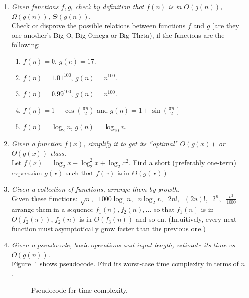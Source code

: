 \documentclass[a4paper,12pt]{article}
\begin{document}
\begin{enumerate}
\item {\small \em Given functions $f,g$, check by definition that $f(n)$ is in $O(g(n))$, $\Omega(g(n))$, $\Theta(g(n))$.}\\
Check or disprove the possible relations between functions $f$ and $g$ (are they one another's Big-O, Big-Omega or Big-Theta), if the
functions are the following:
\begin{enumerate}
\item $f(n) = 0$, $g(n) = 17$.
\item $f(n) = 1.01^{100}$, $g(n) = n^{100}$.
\item $f(n) = 0.99^{100}$, $g(n) = n^{100}$.
\item $f(n) = 1 + \cos\left( \frac{\pi n}{2}\right)$ and  $g(n) = 1 + \sin\left( \frac{\pi n}{2}\right)$
\item $f(n) = \log_2 n$, $g(n) = \log_{10} n$.
\end{enumerate}

\item {\small \em Given a function $f(x)$, simplify it to get its ``optimal'' $O(g(x))$ or $\Theta(g(x))$ class.}\\
Let $f(x) = \log_2 x + \log_2^2 x + \log_2 x^2$. Find a short (preferably one-term) expression $g(x)$ such
that $f(x)$ is in $\Theta(g(x))$.

\item {\small \em Given a collection of functions, arrange them by growth.}\\
Given these functions: $\sqrt{n},\;\;1000 \log_2 n,\;\;n \log_2 n,\;\;2n!,\;\;(2n)!,\;\;2^n,\;\;\frac{n^2}{1000}$
arrange them in a sequence $f_1(n), f_2(n), \ldots$ so that $f_1(n)$ is in $O(f_2(n))$,
$f_2(n)$ is in $O(f_3(n))$ and so on. (Intuitively, every next function must asymptotically grow faster than the previous one.)


\item {\small \em Given a pseudocode, basic operations and input length, estimate its time as $O(g(n))$.}\\
Figure~\ref{fig:part3-big-o-pseudocode} shows pseudocode. Find its worst-case time complexity in terms of $n$.
\begin{figure}[!htb]
\caption{\label{fig:part3-big-o-pseudocode}} Pseudocode for time complexity.
\end{figure}

\end{enumerate}
\end{document}
